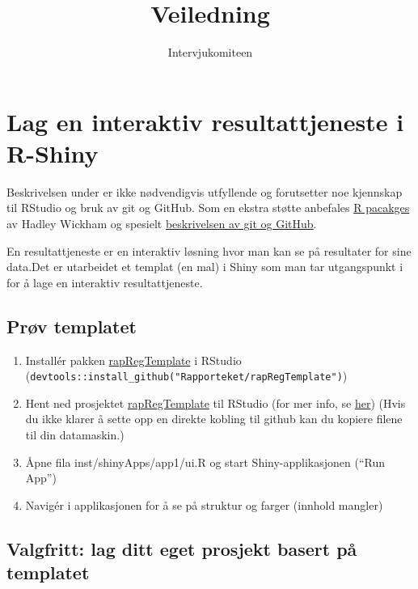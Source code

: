 \documentclass[]{article}
\title{Veiledning}
\author{Intervjukomiteen}
\date{\begin{enumerate}
\def\labelenumi{\arabic{enumi}.}
\setcounter{enumi}{17}
\tightlist
\item
  juni 2019
\end{enumerate}}
\providecommand{\tightlist}{%
  \setlength{\itemsep}{0pt}\setlength{\parskip}{0pt}}
\def\labelenumi{\arabic{enumi}.}
\begin{document}
\maketitle

\section{Lag en interaktiv resultattjeneste i
R-Shiny}\label{lag-en-interaktiv-resultattjeneste-i-r-shiny}

Beskrivelsen under er ikke nødvendigvis utfyllende og forutsetter noe
kjennskap til RStudio og bruk av git og GitHub. Som en ekstra støtte
anbefales \href{http://r-pkgs.had.co.nz/}{R pacakges} av Hadley Wickham
og spesielt
\href{http://r-pkgs.had.co.nz/git.html\#git-rstudio}{beskrivelsen av git
og GitHub}.

En resultattjeneste er en interaktiv løsning hvor man kan se på
resultater for sine data.Det er utarbeidet et templat (en mal) i Shiny
som man tar utgangspunkt i for å lage en interaktiv resultattjeneste.

\subsection{Prøv templatet}\label{prv-templatet}

\begin{enumerate}
\def\labelenumi{\arabic{enumi}.}
\tightlist
\item
  Installér pakken
  \href{https://github.com/Rapporteket/rapRegTemplate}{rapRegTemplate} i
  RStudio
  (\texttt{devtools::install\_github("Rapporteket/rapRegTemplate")})
\item
  Hent ned prosjektet
  \href{https://github.com/Rapporteket/rapRegTemplate}{rapRegTemplate}
  til RStudio (for mer info, se
  \href{https://support.rstudio.com/hc/en-us/articles/200526207-Using-Projects}{her})
  (Hvis du ikke klarer å sette opp en direkte kobling til github kan du
  kopiere filene til din datamaskin.)
\item
  Åpne fila inst/shinyApps/app1/ui.R og start Shiny-applikasjonen (``Run
  App'')
\item
  Navigér i applikasjonen for å se på struktur og farger (innhold
  mangler)
\end{enumerate}

\subsection{Valgfritt: lag ditt eget prosjekt basert på
templatet}\label{valgfritt-lag-ditt-eget-prosjekt-basert-pa-templatet}
\end{document}
